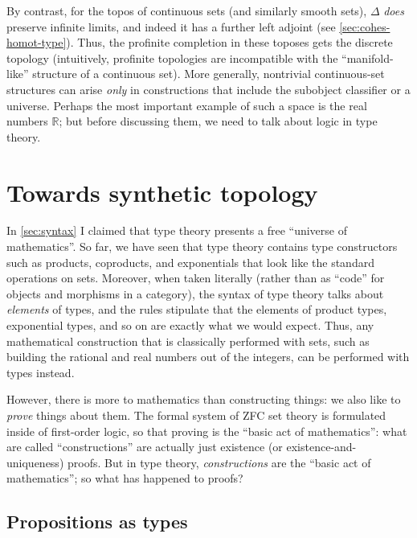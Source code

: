 \documentclass[10pt]{article}
\def\R{\mathbb{R}}
\numberwithin{equation}{section}
\begin{document}
By contrast, for the topos of continuous sets (and similarly smooth sets), $\Delta$ \emph{does} preserve infinite limits, and indeed it has a further left adjoint (see \cref{sec:cohes-homot-type}).
Thus, the profinite completion in these toposes gets the discrete topology (intuitively, profinite topologies are incompatible with the ``manifold-like'' structure of a continuous set).
More generally, nontrivial continuous-set structures can arise \emph{only} in constructions that include the subobject classifier or a universe.
Perhaps the most important example of such a space is the real numbers $\R$;
but before discussing them, we need to talk about logic in type theory.


\section{Towards synthetic topology}
\label{sec:synthetic-topology}

In \cref{sec:syntax} I claimed that type theory presents a free ``universe of mathematics''. %
So far, we have seen that type theory contains type constructors such as products, coproducts, and exponentials that look like the standard operations on sets.
Moreover, when taken literally (rather than as ``code'' for objects and morphisms in a category), the syntax of type theory talks about \emph{elements} of types, and the rules stipulate that the elements of product types, exponential types, and so on are exactly what we would expect.
Thus, any mathematical construction that is classically performed with sets, such as building the rational and real numbers out of the integers, can be performed with types instead. %

However, there is more to mathematics than constructing things: we also like to \emph{prove} things about them.
The formal system of ZFC set theory is formulated inside of first-order logic, so that proving is the ``basic act of mathematics'':
what are called ``constructions'' are actually just existence (or existence-and-uniqueness) proofs.
But in type theory, \emph{constructions} are the ``basic act of mathematics''; so what has happened to proofs?

\subsection{Propositions as types}
\label{sec:prop-as-types}
\end{document}
